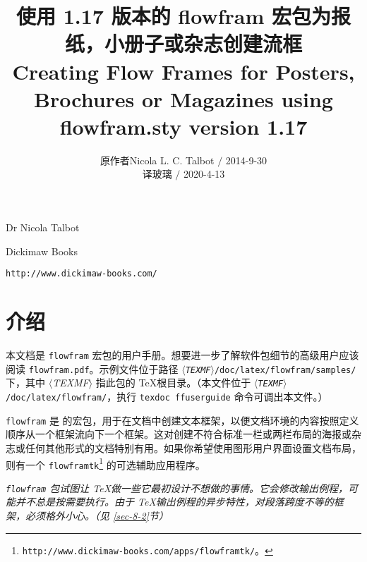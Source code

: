 \documentclass[a4paper]{book}%
\newcommand{\sty}[1]{\texttt{#1}}
\newcommand{\ffdpath}[1]{\texttt{#1}}
\newcommand{\filename}[1]{\texttt{#1}}
\newcommand{\meta}[1]{\textnormal{\ensuremath{\langle}\makebox[0pt][l]{}\emph{#1}\makebox[0pt][l]{}\ensuremath{\rangle}}}
\newcommand{\cmd}[1]{\texttt{#1}}
\newcommand{\link}[1]{\texttt{\color{magenta}#1}}
\begin{document}
\title{\sffamily\bfseries 使用 1.17 版本的 flowfram 宏包为报纸，小册子或杂志创建流框\\
Creating Flow Frames for Posters,\\ Brochures or Magazines using flowfram.sty version 1.17}
\author{原作者\quad Nicola L. C. Talbot $/$ 2014-9-30\\[5pt] 译\quad 玻璃 $/$ 2020-4-13}
\date{}
\maketitle


{\parindent=0pt
Dr Nicola Talbot

Dickimaw Books

\link{http://www.dickimaw-books.com/}
}

\frontmatter
{}

\tableofcontents
{}

\mainmatter
\chapter{介绍}\label{chap-1}%
\enablethumbtabs
{}
本文档是 \sty{flowfram} 宏包的用户手册。想要进一步了解软件包细节的高级用户应该阅读 \filename{flowfram.pdf}。示例文件位于路径 \ffdpath{\meta{TEXMF}/doc/latex/flowfram/samples/} 下，其中 \meta{TEXMF} 指此包的 \TeX 根目录。（本文件位于 \ffdpath{\meta{TEXMF}/doc/latex/flowfram/}，执行 \cmd{texdoc ffuserguide} 命令可调出本文件。）

\sty{flowfram} 是 \LaTeXe 的宏包，用于在文档中创建文本框架，以便文档环境的内容按照定义顺序从一个框架流向下一个框架。这对创建不符合标准一栏或两栏布局的海报或杂志或任何其他形式的文档特别有用。如果你希望使用图形用户界面设置文档布局，则有一个 \filename{flowframtk}\footnote{\link{http://www.dickimaw-books.com/apps/flowframtk/}。} 的可选辅助应用程序。

\emph{\sty{flowfram} 包试图让 \TeX 做一些它最初设计不想做的事情。它会修改输出例程，可能并不总是按需要执行。由于 \TeX 输出例程的异步特性，对段落跨度不等的框架，必须格外小心。（见 \ref{sec-8-2}节）}
\end{document}
